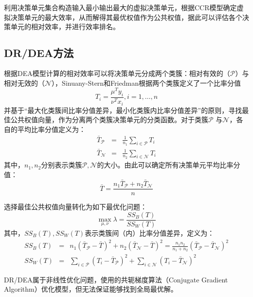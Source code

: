 \cite{li2000ranking}利用决策单元集合构造输入最小输出最大的虚拟决策单元，根据CCR模型确定虚拟决策单元的最大效率，从而解得其最优权值作为公共权值，据此可以评估各个决策单元的相对效率，并进行效率排名。

\subsection{DR/DEA方法}
根据DEA模型计算的相对效率可以将决策单元分成两个类簇：相对有效的（$\mathcal{P}$）与相对无效的（$\mathcal{N}$），Sinuany-Stern和Friedman\cite{sinuany1998dea}根据两个类簇定义了一个比率分值
\begin{equation}\label{eq:dr}
  T_i = \frac{\mu^T y_i}{\nu^T x_i}, i = 1,\ldots, n
\end{equation}
并基于“最大化类簇间比率分值差异，最小化类簇内比率分值差异”的原则，寻找最佳公共权值向量，作为分离两个类簇决策单元的分类函数。对于类簇$\mathcal P$ 与$\mathcal N$，各自的平均比率分值定义为：
\begin{equation}
  \begin{array}{lll}
    \bar{T}_\mathcal{P} & = & \frac{1}{n_1} \sum\limits_{i\in \mathcal{P}} T_i \\
    \bar{T}_\mathcal{N} & = & \frac{1}{n_2} \sum\limits_{i\in \mathcal{N}} T_i
  \end{array}
\end{equation}
其中，$n_1,n_2$分别表示类簇$\mathcal{P},\mathcal{N}$的大小。由此可以确定所有决策单元平均比率分值：
\[
 \bar{T} = \frac{n_1\bar{T}_\mathcal{P} + n_2\bar{T}_\mathcal{N}}{n}
\]

选择最佳公共权值向量转化为如下最优化问题：
\begin{equation}
  \max_{\mu,\nu} \lambda = \frac{SS_B(T)}{SS_W(T)}
\end{equation}
其中，$SS_B(T),SS_W(T)$表示类簇间（内）比率分值差异，定义为：
\begin{equation}
  \begin{array}{lll}
    SS_B(T) & = & n_1(\bar{T}_\mathcal{P} - \bar{T})^2 + n_2(\bar{T}_\mathcal{N} - \bar{T})^2 = \frac{n_1n_2}{n_1+n_2}(\bar{T}_\mathcal{P} - \bar{T}_\mathcal{N})^2\\
    SS_W(T) & = & \sum\limits_{i\in \mathcal{P}} (T_i - \bar{T}_\mathcal{P})^2 + \sum\limits_{i\in \mathcal{N}} (T_i - \bar{T}_\mathcal{N})^2
  \end{array}
\end{equation}

DR/DEA属于非线性优化问题，\cite{sinuany1998dea}使用的共轭梯度算法（Conjugate Gradient Algorithm）优化模型，但无法保证能够找到全局最优解。

